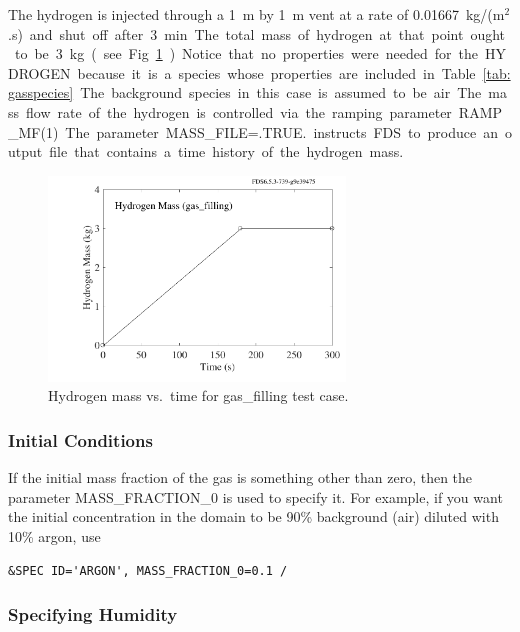 \documentclass[11pt]{book}
\begin{document}
\noindent
The hydrogen is injected through a 1~m by 1~m vent at a rate of 0.01667~\si{kg/(m$^2$.s)} and shut off after 3~min. The total mass of hydrogen at that point ought to be 3~kg (see Fig.~\ref{gas_filling}). Notice that no properties were needed for the {\ct HYDROGEN} because it is a species whose properties are included in Table~\ref{tab:gasspecies}. The background species in this case is assumed to be air. The mass flow rate of the hydrogen is controlled via the ramping parameter {\ct RAMP\_MF(1)}. The parameter {\ct MASS\_FILE=.TRUE.} instructs FDS to produce an output file that contains a time history of the hydrogen mass.
\begin{figure}[h]
\begin{center}
\includegraphics[width=3.1in]{SCRIPT_FIGURES/gas_filling_mass}
\end{center}
\caption[Results of the {\ct gas\_filling} test case]{Hydrogen mass vs.~time for {\ct gas\_filling} test case.}
\label{gas_filling}
\end{figure}

\subsubsection{Initial Conditions}

If the initial mass fraction of the gas is something other than zero, then the parameter {\ct MASS\_FRACTION\_0} is used to specify it. For example, if you want the initial concentration in the domain to be 90\% background (air) diluted with 10\% argon, use

\begin{lstlisting}
&SPEC ID='ARGON', MASS_FRACTION_0=0.1 /
\end{lstlisting}

\subsubsection{Specifying Humidity}
\label{info:humidity}
\end{document}
